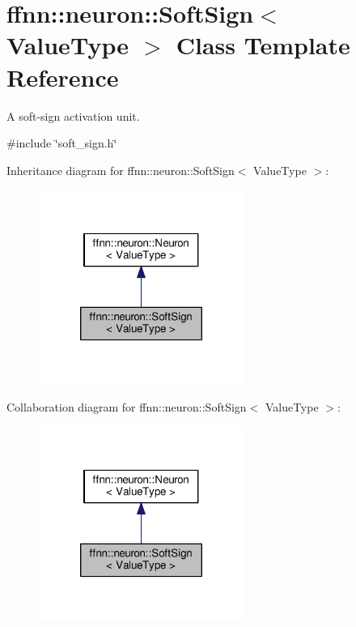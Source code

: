 \hypertarget{classffnn_1_1neuron_1_1_soft_sign}{\section{ffnn\-:\-:neuron\-:\-:Soft\-Sign$<$ Value\-Type $>$ Class Template Reference}
\label{classffnn_1_1neuron_1_1_soft_sign}
}


A soft-\/sign activation unit.  




{\ttfamily \#include \char`\"{}soft\-\_\-sign.\-h\char`\"{}}



Inheritance diagram for ffnn\-:\-:neuron\-:\-:Soft\-Sign$<$ Value\-Type $>$\-:
\nopagebreak
\begin{figure}[H]
\begin{center}
\leavevmode
\includegraphics[width=190pt]{classffnn_1_1neuron_1_1_soft_sign__inherit__graph}
\end{center}
\end{figure}


Collaboration diagram for ffnn\-:\-:neuron\-:\-:Soft\-Sign$<$ Value\-Type $>$\-:
\nopagebreak
\begin{figure}[H]
\begin{center}
\leavevmode
\includegraphics[width=190pt]{classffnn_1_1neuron_1_1_soft_sign__coll__graph}
\end{center}
\end{figure}
